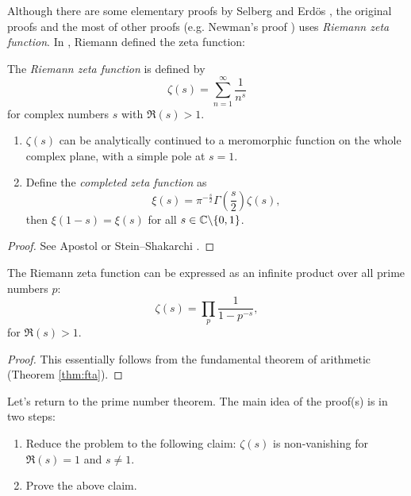 Although there are some elementary proofs by Selberg \cite{selberg1949elementary} and Erd\"os \cite{erdos1949new}, the original proofs and the most of other proofs (e.g. Newman's proof \cite{newman1980simple,zagier1997newman}) uses \emph{Riemann zeta function}.
In \cite{riemann1859ueber}, Riemann defined the zeta function:

\begin{definition}
    \label{def:riemann-zeta}
    The \emph{Riemann zeta function} is defined by
    \[
        \zeta(s) = \sum_{n=1}^\infty \frac{1}{n^s}
    \]
    for complex numbers $s$ with $\Re(s) > 1$.
\end{definition}

\begin{theorem}
    \begin{enumerate}
        \item $\zeta(s)$ can be analytically continued to a meromorphic function on the whole complex plane, with a simple pole at $s = 1$.
        \item Define the \emph{completed zeta function} as
        \begin{equation}
            \xi(s) = \pi^{-\frac{s}{2}} \Gamma\left(\frac{s}{2}\right) \zeta(s),
        \end{equation}
        then $\xi(1 - s) = \xi(s)$ for all $s \in \mathbb{C} \backslash \{0, 1\}$.
    \end{enumerate}
\end{theorem}
\begin{proof}
    See Apostol \cite{apostol2013introduction} or Stein--Shakarchi \cite{stein2010complex}.
\end{proof}

\begin{theorem}
    \label{thm:euler-factorization}
    The Riemann zeta function can be expressed as an infinite product over all prime numbers $p$:
    \begin{equation}
        \zeta(s) = \prod_{p} \frac{1}{1 - p^{-s}},
        \label{eq:euler-factorization}
    \end{equation}
    for $\Re(s) > 1$.
\end{theorem}
\begin{proof}
    This essentially follows from the fundamental theorem of arithmetic (Theorem \ref{thm:fta}).
\end{proof}

Let's return to the prime number theorem.
The main idea of the proof(s) is in two steps:
\begin{enumerate}
    \item Reduce the problem to the following claim: $\zeta(s)$ is non-vanishing for $\Re(s) = 1$ and $s \ne 1$.
    \item Prove the above claim.
\end{enumerate}

